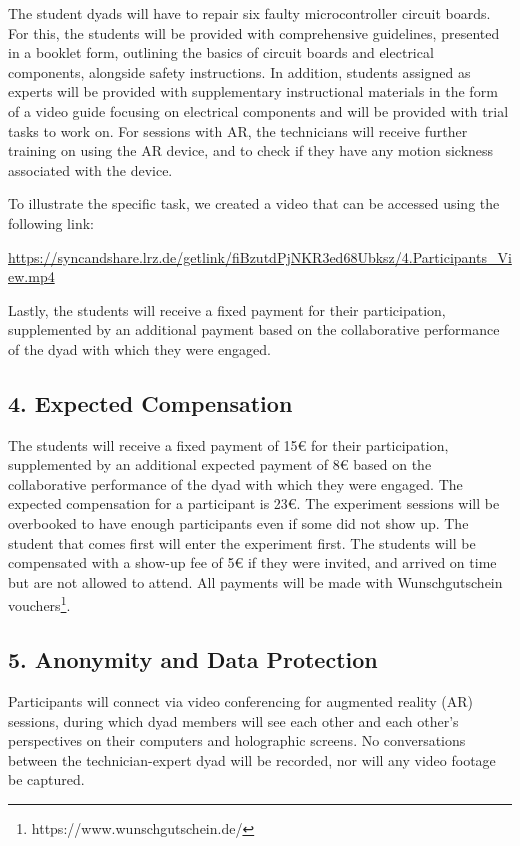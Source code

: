 \documentclass[A4,11pt]{article}
\begin{document}
The student dyads will have to repair six faulty microcontroller circuit boards. For this, the students will be provided with comprehensive guidelines, presented in a booklet form, outlining the basics of circuit boards and electrical components, alongside safety instructions. In addition, students assigned as experts will be provided with supplementary instructional materials in the form of a video guide focusing on electrical components and will be provided with trial tasks to work on. For sessions with AR, the technicians will receive further training on using the AR device, and to check if they have any motion sickness associated with the device.

To illustrate the specific task, we created a video that can be accessed using the following link:

\url{https://syncandshare.lrz.de/getlink/fiBzutdPjNKR3ed68Ubksz/4.Participants_View.mp4}

Lastly, the students will receive a fixed payment for their participation, supplemented by an additional payment based on the collaborative performance of the dyad with which they were engaged.

\subsection*{4. Expected Compensation}
The students will receive a fixed payment of 15€ for their participation, supplemented by an additional expected payment of 8€ based on the collaborative performance of the dyad with which they were engaged. The expected compensation for a participant is 23€. The experiment sessions will be overbooked to have enough participants even if some did not show up. The student that comes first will enter the experiment first. The students will be compensated with a show-up fee of 5€ if they were invited, and arrived on time but are not allowed to attend. All payments will be made with Wunschgutschein vouchers\footnote{https://www.wunschgutschein.de/}.

\subsection*{5. Anonymity and Data Protection}
Participants will connect via video conferencing for augmented reality (AR) sessions, during which dyad members will see each other and each other's perspectives on their computers and holographic screens. No conversations between the technician-expert dyad will be recorded, nor will any video footage be captured.
\end{document}
